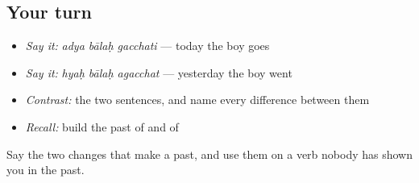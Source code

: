\subsection*{Your turn}
\begin{itemize}
\raggedright
  \item \emph{Say it:} \emph{adya bālaḥ gacchati} — today the boy goes
  \item \emph{Say it:} \emph{hyaḥ bālaḥ agacchat} — yesterday the boy went
  \item \emph{Contrast:} the two sentences, and name every difference between them
  \item \emph{Recall:} build the past of \textbf{} and of \textbf{}
\end{itemize}

\begin{tcolorbox}[breakable,colback=teal!4,colframe=teal!35!black,title={Before you move on}]
Say the two changes that make a past, and use them on a verb nobody has shown you in the past.
\end{tcolorbox}
